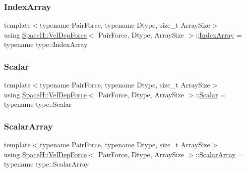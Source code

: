 \mbox{\label{struct_space_h_1_1_vel_dep_force_a81473a733ed71f51b81323c705283195}} 
\subsubsection{\texorpdfstring{Index\+Array}{IndexArray}}
{\footnotesize\ttfamily template$<$typename Pair\+Force, typename Dtype, size\+\_\+t Array\+Size$>$ \\
using \mbox{\hyperlink{struct_space_h_1_1_vel_dep_force}{Space\+H\+::\+Vel\+Dep\+Force}}$<$ Pair\+Force, Dtype, Array\+Size $>$\+::\mbox{\hyperlink{struct_space_h_1_1_vel_dep_force_a81473a733ed71f51b81323c705283195}{Index\+Array}} =  typename type\+::\+Index\+Array}

\mbox{\label{struct_space_h_1_1_vel_dep_force_abbc363fffee12f9e015fd4978c132aad}} 
\subsubsection{\texorpdfstring{Scalar}{Scalar}}
{\footnotesize\ttfamily template$<$typename Pair\+Force, typename Dtype, size\+\_\+t Array\+Size$>$ \\
using \mbox{\hyperlink{struct_space_h_1_1_vel_dep_force}{Space\+H\+::\+Vel\+Dep\+Force}}$<$ Pair\+Force, Dtype, Array\+Size $>$\+::\mbox{\hyperlink{struct_space_h_1_1_vel_dep_force_abbc363fffee12f9e015fd4978c132aad}{Scalar}} =  typename type\+::\+Scalar}

\mbox{\label{struct_space_h_1_1_vel_dep_force_ae4efbb88779fc063293b7853184378ac}} 
\subsubsection{\texorpdfstring{Scalar\+Array}{ScalarArray}}
{\footnotesize\ttfamily template$<$typename Pair\+Force, typename Dtype, size\+\_\+t Array\+Size$>$ \\
using \mbox{\hyperlink{struct_space_h_1_1_vel_dep_force}{Space\+H\+::\+Vel\+Dep\+Force}}$<$ Pair\+Force, Dtype, Array\+Size $>$\+::\mbox{\hyperlink{struct_space_h_1_1_vel_dep_force_ae4efbb88779fc063293b7853184378ac}{Scalar\+Array}} =  typename type\+::\+Scalar\+Array}

